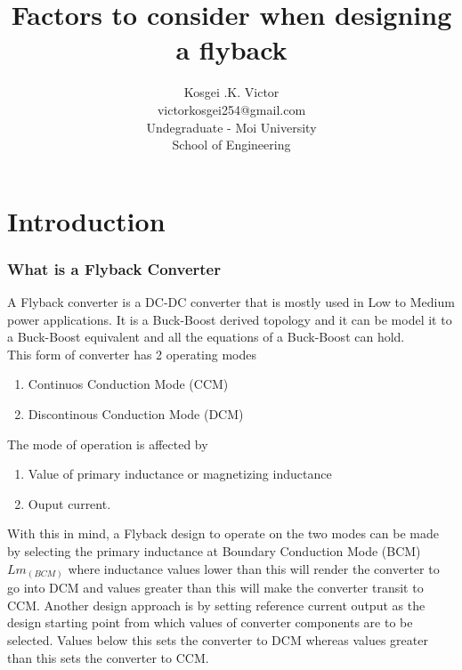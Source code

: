 \documentclass{article}
\begin{document}
    \title{Factors to consider when designing a flyback}
    \author{
        Kosgei .K. Victor\\victorkosgei254@gmail.com\\Undegraduate - Moi University\\School of Engineering
    }
    \maketitle

\tableofcontents
\section[Introduction]{Introduction}
\subsubsection[What is a Flyback Converter]{What is a Flyback Converter}
A Flyback converter is a DC-DC converter that is mostly used in Low to Medium power applications. It is a Buck-Boost derived
topology and it can be model it to a Buck-Boost equivalent and all the equations of a Buck-Boost can hold.
\\
This form of converter has 2 operating modes \begin{enumerate}
    \item Continuos Conduction Mode (CCM)
    \item Discontinous Conduction Mode (DCM)
\end{enumerate}
The mode of operation is affected by\begin{enumerate}
    \item Value of primary inductance or magnetizing inductance
    \item Ouput current.
\end{enumerate}
With this in mind, a Flyback design to operate on the two modes can be made by selecting the primary inductance at Boundary Conduction Mode (BCM) $Lm_(BCM)$ where inductance values lower than this will render the converter to go into DCM and values greater than this will make the converter transit to CCM.
Another design approach is by setting reference current output as the design starting point from which values of converter components are to be selected. Values below this sets the converter to DCM whereas values greater than this sets the converter to CCM.
\end{document}
